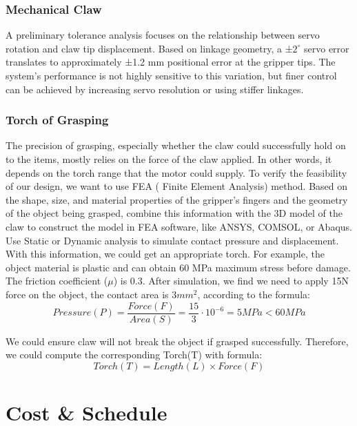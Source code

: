 \documentclass{senior-design}
\begin{document}
\subsection{Mechanical Claw}
A preliminary tolerance analysis focuses on the relationship between servo 
rotation and claw tip displacement. Based on linkage geometry, a ±$2^{\circ}$ servo 
error translates to approximately ±1.2 mm positional error at the gripper tips. 
The system’s performance is not highly sensitive to this variation, but finer 
control can be achieved by increasing servo resolution or using stiffer 
linkages. 
\subsection{Torch of Grasping}
The precision of grasping, especially whether the claw could successfully hold 
on to the items, mostly relies on the force of the claw applied. In other words, 
it depends on the torch range that the motor could supply. To verify the 
feasibility of our design, we want to use FEA ( Finite Element Analysis) 
method. Based on the shape, size, and material properties of the gripper’s 
fingers and the geometry of the object being grasped, combine this information 
with the 3D model of the claw to construct the model in FEA software, like 
ANSYS, COMSOL, or Abaqus. Use Static or Dynamic analysis to simulate contact 
pressure and displacement. With this information, we could get an appropriate 
torch. For example, the object material is plastic and can obtain 60 MPa 
maximum stress before damage. The friction coefficient ($\mu$) is 0.3. After 
simulation, we find we need to apply 15N force on the object, the contact area 
is $3mm^2$, according to the formula: 
\begin{equation*}
    Pressure(P)=\frac{Force(F)}{Area(S)}=\frac{15}{3} \cdot 10^{-6}=5MPa<60MPa 
\end{equation*}

We could ensure claw will not break the object if grasped successfully. Therefore, we could compute the corresponding Torch(T) with formula: 
\begin{equation*}
    Torch(T)=Length(L) \times Force(F)
\end{equation*} 
\chapter{Cost \& Schedule}
\end{document}
